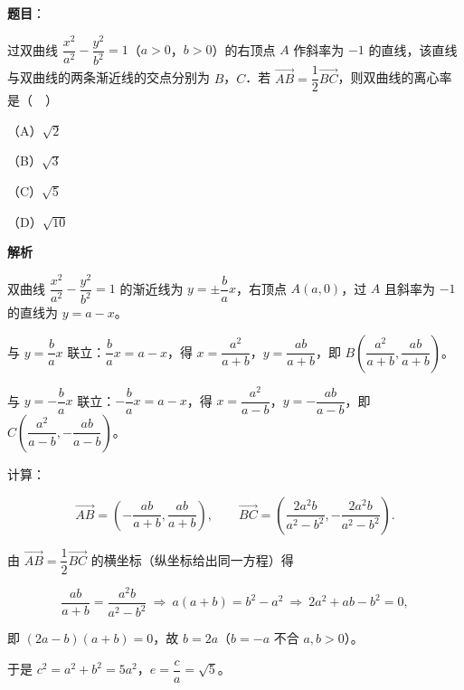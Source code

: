 \begin{answer}

\textbf{题目}：

过双曲线 $\dfrac{x^2}{a^2}-\dfrac{y^2}{b^2}=1$（$a>0$，$b>0$）的右顶点 $A$ 作斜率为 $-1$ 的直线，该直线与双曲线的两条渐近线的交点分别为 $B$，$C$．若 $\overrightarrow{AB}=\dfrac12\overrightarrow{BC}$，则双曲线的离心率是（　）

（A）$\sqrt2$

（B）$\sqrt3$

（C）$\sqrt5$

（D）$\sqrt{10}$

\textbf{解析}

双曲线 $\dfrac{x^2}{a^2}-\dfrac{y^2}{b^2}=1$ 的渐近线为 $y=\pm\dfrac bax$，右顶点 $A(a,0)$，过 $A$ 且斜率为 $-1$ 的直线为 $y=a-x$。

与 $y=\dfrac bax$ 联立：$\dfrac ba x=a-x$，得 $x=\dfrac{a^2}{a+b}$，$y=\dfrac{ab}{a+b}$，即 $B\left(\dfrac{a^2}{a+b},\dfrac{ab}{a+b}\right)$。

与 $y=-\dfrac bax$ 联立：$-\dfrac ba x=a-x$，得 $x=\dfrac{a^2}{a-b}$，$y=-\dfrac{ab}{a-b}$，即 $C\left(\dfrac{a^2}{a-b},-\dfrac{ab}{a-b}\right)$。

计算：

\nopagebreak[4]
\[\overrightarrow{AB}=\left(-\frac{ab}{a+b},\frac{ab}{a+b}\right),\qquad
\overrightarrow{BC}=\left(\frac{2a^2b}{a^2-b^2},-\frac{2a^2b}{a^2-b^2}\right).\]

由 $\overrightarrow{AB}=\dfrac12\overrightarrow{BC}$ 的横坐标（纵坐标给出同一方程）得

\nopagebreak[4]
\[\frac{ab}{a+b}=\frac{a^2b}{a^2-b^2}\ \Longrightarrow\ a(a+b)=b^2-a^2\ \Longrightarrow\ 2a^2+ab-b^2=0,\]

即 $(2a-b)(a+b)=0$，故 $b=2a$（$b=-a$ 不合 $a,b>0$）。

于是 $c^2=a^2+b^2=5a^2$，$e=\dfrac ca=\sqrt5$。


\end{answer}
